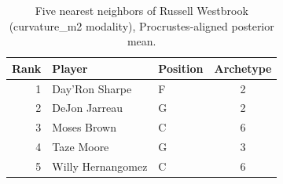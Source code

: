 \begin{table}[htbp]
  \centering\small
  \begin{tabular}{rllc}
    \toprule
    Rank & Player & Position & Archetype \\
    \midrule
    1 & Day'Ron Sharpe & F & 2 \\
    2 & DeJon Jarreau & G & 2 \\
    3 & Moses Brown & C & 6 \\
    4 & Taze Moore & G & 3 \\
    5 & Willy Hernangomez & C & 6 \\
    \bottomrule
  \end{tabular}
  \caption{Five nearest neighbors of Russell Westbrook (curvature_m2 modality), Procrustes-aligned posterior mean.}
  \label{tab:Russell_Westbrook_neighbors_curvature_m2}
\end{table}

